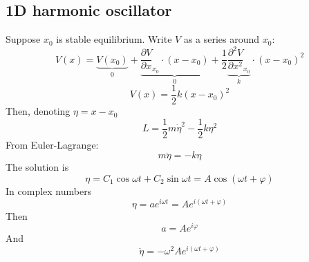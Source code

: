 \subsection{1D harmonic oscillator}
Suppose $x_0$ is stable equilibrium. Write $V$ as a series around $x_0$:
$$V(x) = \underbrace{V(x_0)}_{0} + \underbrace{\frac{\partial V}{\partial x}_{x_0}\cdot (x-x_0)}_{0} + \frac{1}{2}\underbrace{\frac{\partial^2 V}{\partial x^2}_{x_0}}_{k}\cdot (x-x_0)^2$$
$$V(x) = \frac{1}{2}k(x-x_0)^2$$
Then, denoting $\eta = x - x_0$
$$L = \frac{1}{2}m\dot{\eta}^2 - \frac{1}{2} k \eta^2$$
From Euler-Lagrange:
$$m\ddot{\eta} = -k \eta$$
The solution is
$$\eta = C_1 \cos \omega t + C_2 \sin \omega t = A \cos (\omega t + \varphi)$$
In complex numbers
$$\eta = ae^{i \omega t} = A e^{i(\omega t + \varphi)}$$
Then 
$$a = A e^{i\varphi}$$
And
$$\ddot{\eta} = -\omega^2  A e^{i(\omega t + \varphi)}$$